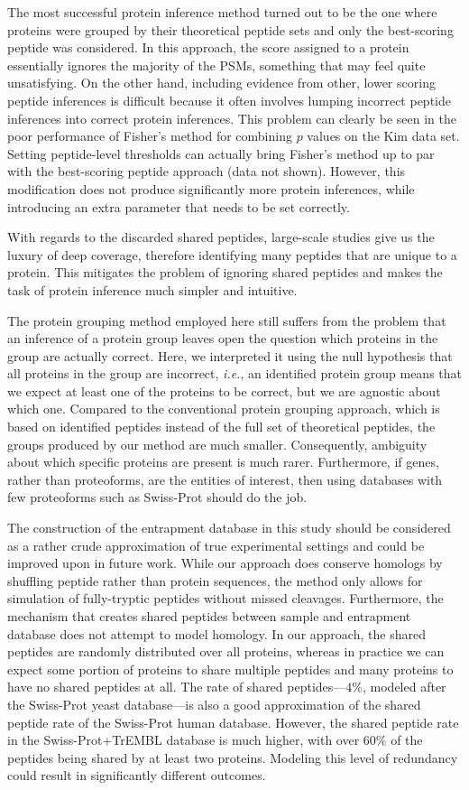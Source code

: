 \documentclass{article}
\begin{document}
The most successful protein inference method turned out to be the one
where proteins were grouped by their theoretical peptide sets and only
the best-scoring peptide was considered. In this approach, the score
assigned to a protein essentially ignores the majority of the PSMs,
something that may feel quite unsatisfying. On the other hand,
including evidence from other, lower scoring peptide inferences
is difficult because it often involves lumping incorrect peptide
inferences into correct protein inferences.  This problem
can clearly be seen in the poor performance of Fisher's method for
combining $p$ values on the Kim data set. Setting peptide-level
thresholds can actually bring Fisher's method up to par with the
best-scoring peptide approach (data not shown). However, this
modification does not produce significantly more protein
inferences, while introducing an extra parameter that needs to be
set correctly.

With regards to the discarded shared peptides, large-scale studies
give us the luxury of deep coverage, therefore identifying many
peptides that are unique to a protein. This mitigates the problem of
ignoring shared peptides and makes the task of protein inference much
simpler and intuitive.  

The protein grouping method employed here still suffers from the
problem that an inference of a protein group leaves open the
question which proteins in the group are actually correct. Here, we
interpreted it using the null hypothesis that all proteins in the
group are incorrect, {\em i.e.}, an identified protein group means
that we expect at least one of the proteins to be correct, but we are
agnostic about which one. Compared to the conventional protein
grouping approach, which is based on identified peptides instead of
the full set of theoretical peptides, the groups produced by our
method are much smaller.  Consequently, ambiguity about which specific
proteins are present is much rarer.  Furthermore, if genes, rather
than proteoforms, are the entities of interest, then using databases
with few proteoforms such as Swiss-Prot should do the job.

The construction of the entrapment database in this study should be
considered as a rather crude approximation of true experimental
settings and could be improved upon in future work. While our approach
does conserve homologs by shuffling peptide rather than protein
sequences, the method only allows for simulation of fully-tryptic
peptides without missed cleavages.  Furthermore, the mechanism that
creates shared peptides between sample and entrapment database does
not attempt to model homology.  In our approach, the shared peptides
are randomly distributed over all proteins, whereas in practice we can
expect some portion of proteins to share multiple peptides and many
proteins to have no shared peptides at all. The rate of shared
peptides---$4\%$, modeled after the Swiss-Prot yeast database---is
also a good approximation of the shared peptide rate of the Swiss-Prot
human database. However, the shared peptide rate in the
Swiss-Prot+TrEMBL database is much higher, with over $60\%$ of the
peptides being shared by at least two proteins.  Modeling this level
of redundancy could result in significantly different outcomes.
\end{document}

